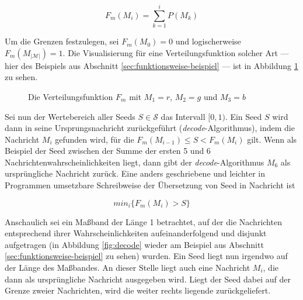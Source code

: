 $$F_m(M_i) = \sum_{k = 1}^{i} P(M_k)$$

Um die Grenzen festzulegen, sei $F_m(M_0) = 0$ und logischerweise $F_m(M_{|\mathcal{M}|}) = 1$. Die Visualisierung für eine Verteilungsfunktion solcher Art --- hier des Beispiels aus Abschnitt \ref{sec:funktionsweise-beispiel} --- ist in Abbildung \ref{fig:Verteilungsfunktion} zu sehen.

\begin{figure}[!h]
\center
{}
\caption{Die Verteilungsfunktion $F_m$ mit $M_1 = r$, $M_2 = g$ und $M_3 = b$}
\label{fig:Verteilungsfunktion}
\end{figure}

Sei nun der Wertebereich aller Seeds $S \in \mathcal{S}$ das Intervall $[0,1)$. Ein Seed $S$ wird dann in seine Ursprungsnachricht zurückgeführt (\emph{decode}-Algorithmus), indem die Nachricht $M_i$ gefunden wird, für die $F_m(M_{i-1}) \leq S < F_m(M_i)$ gilt. Wenn als Beispiel der Seed zwischen der Summe der ersten 5 und 6 Nachrichtenwahrscheinlichkeiten liegt, dann gibt der \emph{decode}-Algorithmus $M_6$ als ursprüngliche Nachricht zurück. Eine anders geschriebene und leichter in Programmen umsetzbare Schreibweise der Übersetzung von Seed in Nachricht ist

$$min_i\{F_m(M_i) > S\}$$

Anschaulich sei ein Maßband der Länge 1 betrachtet, auf der die Nachrichten entsprechend ihrer Wahrscheinlichkeiten aufeinanderfolgend und disjunkt aufgetragen (in Abbildung \ref{fig:decode} wieder am Beispiel aus Abschnitt \ref{sec:funktionsweise-beispiel} zu sehen) wurden. Ein Seed liegt nun irgendwo auf der Länge des Maßbandes. An dieser Stelle liegt auch eine Nachricht $M_i$, die dann als ursprüngliche Nachricht ausgegeben wird. Liegt der Seed dabei auf der Grenze zweier Nachrichten, wird die weiter rechts liegende zurückgeliefert.

